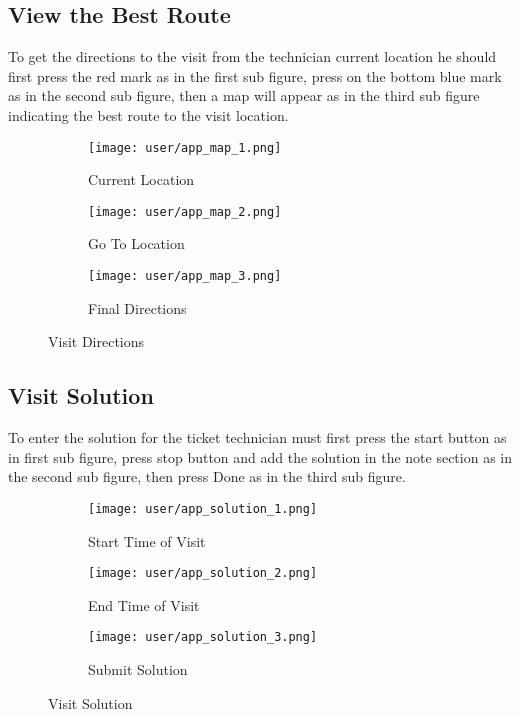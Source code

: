 \subsection{View the Best Route}
	To get the directions to the visit from the technician current location he should first press the red mark as in the first sub figure, press on the bottom blue mark as in the second sub figure, then a map will appear as in the third sub figure indicating the best route to the visit location.
	
	\begin{figure}[ht]
		\centering
		\begin{subfigure}[b]{0.3\textwidth}
			\centering
			\texttt{[image: user/app\_map\_1.png]}
			\caption{Current Location}
		\end{subfigure}
		\hfill
		\begin{subfigure}[b]{0.3\textwidth}
			\centering
			\texttt{[image: user/app\_map\_2.png]}
			\caption{Go To Location}
		\end{subfigure}
		\hfill
		\begin{subfigure}[b]{0.3\textwidth}
			\centering
			\texttt{[image: user/app\_map\_3.png]}
			\caption{Final Directions}
		\end{subfigure}
		\hfill
		\caption{Visit Directions}
	\end{figure}
	
\subsection{Visit Solution}
	To enter the solution for the ticket technician must first press the start button as in first sub figure, press stop button and add the solution in the note section as in the second sub figure, then press Done as in the third sub figure.
	\begin{figure}[H]
		\centering
		\begin{subfigure}[b]{0.3\textwidth}
			\centering
			\texttt{[image: user/app\_solution\_1.png]}
			\caption{Start Time of Visit}
		\end{subfigure}
		\hfill
		\begin{subfigure}[b]{0.3\textwidth}
			\centering
			\texttt{[image: user/app\_solution\_2.png]}
			\caption{End Time of Visit}
		\end{subfigure}
		\hfill
		\begin{subfigure}[b]{0.3\textwidth}
			\centering
			\texttt{[image: user/app\_solution\_3.png]}
			\caption{Submit Solution}
		\end{subfigure}
		\hfill
		\caption{Visit Solution}
	\end{figure}

